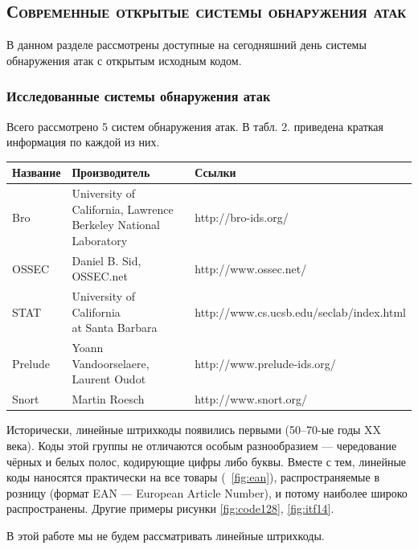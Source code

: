 \subsection{\textsc{Современные открытые системы обнаружения атак}}

В данном разделе рассмотрены доступные на сегодняшний день системы
обнаружения атак с открытым исходным кодом.

\subsubsection{Исследованные системы обнаружения атак}

Всего рассмотрено 5 систем обнаружения атак. В табл. 2. приведена краткая информация по каждой из них.

\begin{center}
\begin{tabular}{ | l | l | l | }

\hline
Название & Производитель & Ссылки \\ \hline
Bro & \specialcell{University of California, Lawrence\\Berkeley National Laboratory} & http://bro-ids.org/ \\ \hline
OSSEC & Daniel B. Sid, OSSEC.net & http://www.ossec.net/ \\ \hline
STAT & \specialcell{University of California\\at Santa Barbara} & http://www.cs.ucsb.edu/seclab/index.html \\ \hline
Prelude & \specialcell{Yoann Vandoorselaere,\\Laurent Oudot} & http://www.prelude-ids.org/ \\ \hline
Snort & Martin Roesch & http://www.snort.org/ \\ \hline

\end{tabular}
\end{center}


Исторически, линейные штрихкоды появились первыми (50--70-ые годы 
XX века). Коды этой группы не отличаются особым разнообразием ---
чередование чёрных и белых полос, кодирующие цифры либо буквы. Вместе
с тем, линейные коды наносятся практически на все товары 
(\figurename\ \ref{fig:ean}), 
распространяемые в розницу (формат EAN --- European Article Number),
и потому наиболее широко распространены. Другие примеры рисунки 
\ref{fig:code128}, \ref{fig:itf14}. 

В этой работе мы не будем рассматривать линейные штрихкоды.

